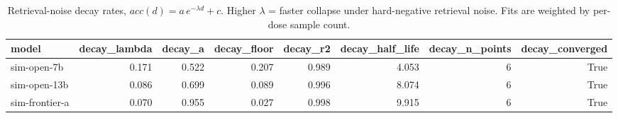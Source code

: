 \begin{table}[t]
\centering
\small
\begin{tabular}{lrrrrrrr}
\toprule
model & decay\_lambda & decay\_a & decay\_floor & decay\_r2 & decay\_half\_life & decay\_n\_points & decay\_converged \\
\midrule
sim-open-7b & 0.171 & 0.522 & 0.207 & 0.989 & 4.053 & 6 & True \\
sim-open-13b & 0.086 & 0.699 & 0.089 & 0.996 & 8.074 & 6 & True \\
sim-frontier-a & 0.070 & 0.955 & 0.027 & 0.998 & 9.915 & 6 & True \\
\bottomrule
\end{tabular}
\caption{Retrieval-noise decay rates, $acc(d)=a\,e^{-\lambda d}+c$. Higher $\lambda$ = faster collapse under hard-negative retrieval noise. Fits are weighted by per-dose sample count.}
\end{table}
